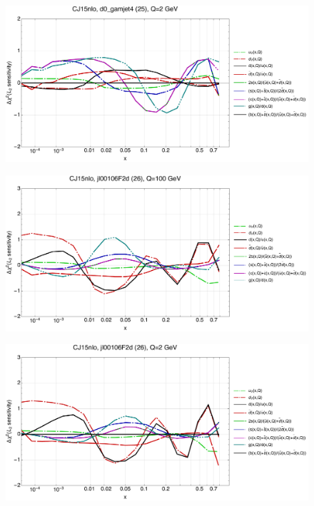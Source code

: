 \documentclass[10pt,aps,prd,floatfix,titlepage]{revtex4}
\begin{document}
\begin{figure}
\includegraphics[width=\textwidth,height=0.44\textheight,keepaspectratio]{2/25_CJ15nlo_q2_Sf_2.pdf}
\caption{}
\end{figure}
\clearpage
\begin{figure}
\includegraphics[width=\textwidth,height=0.44\textheight,keepaspectratio]{2/26_CJ15nlo_q100_Sf_2.pdf}
\caption{}
\end{figure}
\begin{figure}
\includegraphics[width=\textwidth,height=0.44\textheight,keepaspectratio]{2/26_CJ15nlo_q2_Sf_2.pdf}
\caption{}
\end{figure}
\end{document}
